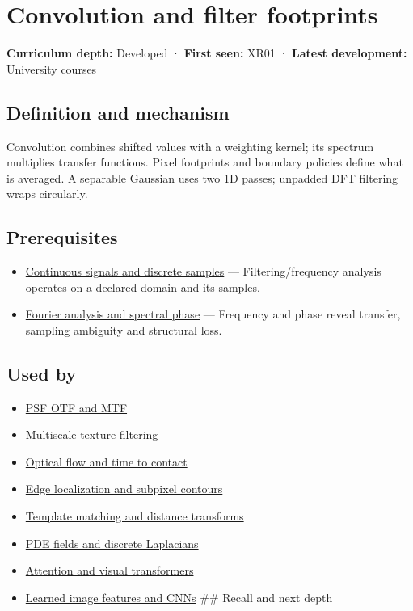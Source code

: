 \hypertarget{appendix-d5b3c692d9f0}{}\label{referencestart:appendix-d5b3c692d9f0}
\section{Convolution and filter footprints}\label{appendix-d5b3c692d9f0-convolution-and-filter-footprints}

\textbf{Curriculum depth:} Developed · \textbf{First seen:} XR01 · \textbf{Latest development:} University courses

\subsection{Definition and mechanism}\label{appendix-d5b3c692d9f0-definition-and-mechanism}

Convolution combines shifted values with a weighting kernel; its spectrum multiplies transfer functions. Pixel footprints and boundary policies define what is averaged. A separable Gaussian uses two 1D passes; unpadded DFT filtering wraps circularly.

\subsection{Prerequisites}\label{appendix-d5b3c692d9f0-prerequisites}

\begin{itemize}
\tightlist
\item
  \hyperref[appendix-1077ea8fc737]{Continuous signals and discrete samples} --- Filtering/frequency analysis operates on a declared domain and its samples.
\item
  \hyperref[appendix-b60686ba06a1]{Fourier analysis and spectral phase} --- Frequency and phase reveal transfer, sampling ambiguity and structural loss.
\end{itemize}

\subsection{Used by}\label{appendix-d5b3c692d9f0-used-by}

\begin{itemize}
\item
  \hyperref[appendix-8b76b0efd27f]{PSF OTF and MTF}
\item
  \hyperref[appendix-b677a85ba76f]{Multiscale texture filtering}
\item
  \hyperref[appendix-e2e73f8cd93e]{Optical flow and time to contact}
\item
  \hyperref[appendix-36022286b03e]{Edge localization and subpixel contours}
\item
  \hyperref[appendix-5fb4af80d1c7]{Template matching and distance transforms}
\item
  \hyperref[appendix-1988d465c119]{PDE fields and discrete Laplacians}
\item
  \hyperref[appendix-a9d5dfdd164a]{Attention and visual transformers}
\item
  \hyperref[appendix-47c51ea026fb]{Learned image features and CNNs} \#\# Recall and next depth
\end{itemize}

